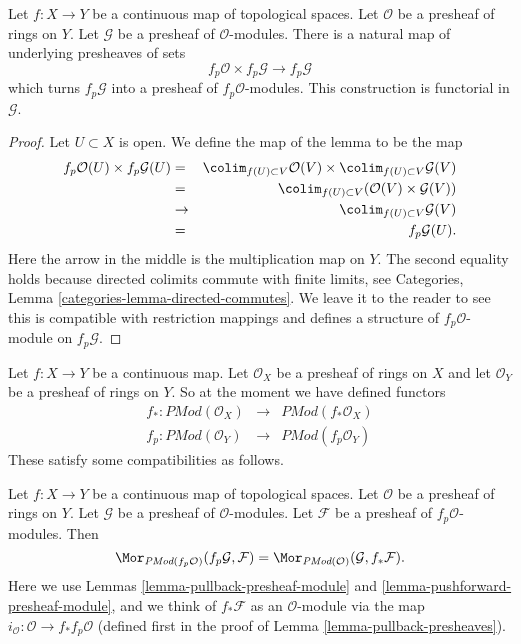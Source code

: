 \begin{lemma}
\label{lemma-pullback-presheaf-module}
Let $f : X \to Y$ be a continuous map of topological spaces.
Let $\mathcal{O}$ be a presheaf of rings on $Y$. Let
$\mathcal{G}$ be a presheaf of $\mathcal{O}$-modules.
There is a natural map of underlying presheaves of sets
$$
f_p\mathcal{O} \times f_p\mathcal{G}
\longrightarrow
f_p\mathcal{G}
$$
which turns $f_p\mathcal{G}$ into a presheaf of $f_p\mathcal{O}$-modules.
This construction is functorial in $\mathcal{G}$.
\end{lemma}

\begin{proof}
Let $U \subset X$ is open. We define the map of the lemma
to be the map
\begin{eqnarray*}
f_p\mathcal{O}(U) \times f_p\mathcal{G}(U)
& = &
\colim_{f(U) \subset V} \mathcal{O}(V)
\times
\colim_{f(U) \subset V} \mathcal{G}(V) \\
& = &
\colim_{f(U) \subset V} (\mathcal{O}(V)\times \mathcal{G}(V)) \\
& \to &
\colim_{f(U) \subset V} \mathcal{G}(V) \\
& = &
f_p\mathcal{G}(U).
\end{eqnarray*}
Here the arrow in the middle is the multiplication map on $Y$.
The second equality holds because directed colimits commute
with finite limits, see
Categories, Lemma \ref{categories-lemma-directed-commutes}.
We leave it to the reader to see this is compatible with
restriction mappings and defines a structure of
$f_p\mathcal{O}$-module on $f_p\mathcal{G}$.
\end{proof}

\noindent
Let $f : X \to Y$ be a continuous map.
Let $\mathcal{O}_X$ be a presheaf of rings on $X$ and
let $\mathcal{O}_Y$ be a presheaf of rings on $Y$.
So at the moment we have defined functors
\begin{eqnarray*}
f_* : \textit{PMod}(\mathcal{O}_X) &
\longrightarrow &
\textit{PMod}(f_*\mathcal{O}_X) \\
f_p : \textit{PMod}(\mathcal{O}_Y) &
\longrightarrow &
\textit{PMod}(f_p\mathcal{O}_Y)
\end{eqnarray*}
These satisfy some compatibilities as follows.

\begin{lemma}
\label{lemma-adjoint-push-pull-presheaves-modules}
Let $f : X \to Y$ be a continuous map of topological spaces.
Let $\mathcal{O}$ be a presheaf of rings on $Y$.
Let $\mathcal{G}$ be a presheaf of $\mathcal{O}$-modules.
Let $\mathcal{F}$ be a presheaf of $f_p\mathcal{O}$-modules.
Then
$$
\Mor_{\textit{PMod}(f_p\mathcal{O})}(f_p\mathcal{G}, \mathcal{F})
=
\Mor_{\textit{PMod}(\mathcal{O})}(\mathcal{G}, f_*\mathcal{F}).
$$
Here we use
Lemmas \ref{lemma-pullback-presheaf-module}
and \ref{lemma-pushforward-presheaf-module}, and we think of
$f_*\mathcal{F}$ as an $\mathcal{O}$-module via the map
$i_\mathcal{O} : \mathcal{O} \to f_*f_p\mathcal{O}$
(defined first in the proof of Lemma \ref{lemma-pullback-presheaves}).
\end{lemma}

